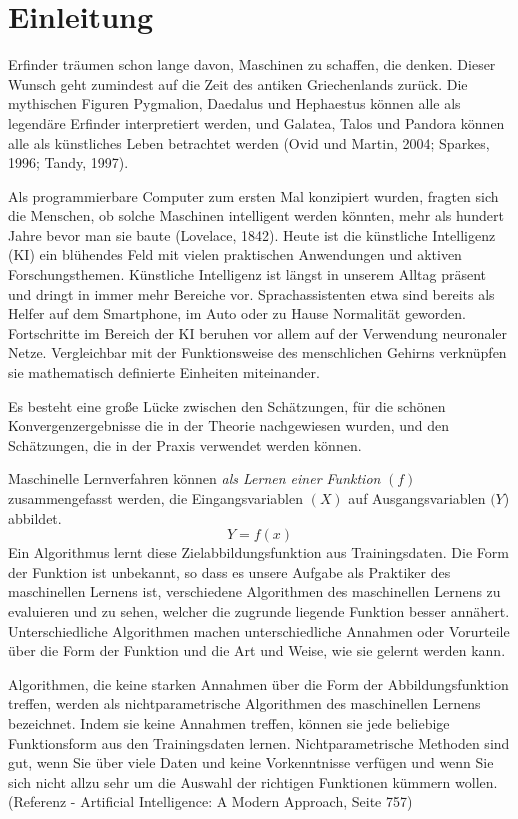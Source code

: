 \chapter*{Einleitung}

Erfinder träumen schon lange davon, Maschinen zu schaffen, die denken. Dieser Wunsch geht zumindest auf die Zeit des antiken Griechenlands zurück. Die mythischen Figuren Pygmalion, Daedalus und Hephaestus können alle als legendäre Erfinder interpretiert werden, und Galatea, Talos und Pandora können alle als künstliches Leben betrachtet werden (Ovid und Martin, 2004; Sparkes, 1996; Tandy, 1997).

Als programmierbare Computer zum ersten Mal konzipiert wurden, fragten sich die Menschen, ob solche Maschinen intelligent werden könnten, mehr als hundert Jahre bevor man sie baute (Lovelace, 1842). Heute ist die künstliche Intelligenz (KI) ein blühendes Feld mit vielen praktischen Anwendungen und aktiven Forschungsthemen. 
Künstliche Intelligenz ist längst in unserem Alltag präsent und dringt in immer mehr Bereiche vor. Sprachassistenten etwa sind bereits als Helfer auf dem Smartphone, im Auto oder zu Hause Normalität geworden. Fortschritte im Bereich der KI beruhen vor allem auf der Verwendung neuronaler Netze. Vergleichbar mit der Funktionsweise des menschlichen Gehirns verknüpfen sie mathematisch definierte Einheiten miteinander.

Es besteht eine große Lücke zwischen den Schätzungen, für die schönen Konvergenzergebnisse die in der Theorie nachgewiesen wurden, und den Schätzungen, die in der Praxis verwendet werden können.

Maschinelle Lernverfahren können \emph{als Lernen einer Funktion} $(f)$ zusammengefasst werden, die Eingangsvariablen $(X)$ auf Ausgangsvariablen $(Y$) abbildet.
$$Y = f(x)$$
Ein Algorithmus lernt diese Zielabbildungsfunktion aus Trainingsdaten.
Die Form der Funktion ist unbekannt, so dass es unsere Aufgabe als Praktiker des maschinellen Lernens ist, verschiedene Algorithmen des maschinellen Lernens zu evaluieren und zu sehen, welcher die zugrunde liegende Funktion besser annähert.
Unterschiedliche Algorithmen machen unterschiedliche Annahmen oder Vorurteile über die Form der Funktion und die Art und Weise, wie sie gelernt werden kann.

Algorithmen, die keine starken Annahmen über die Form der Abbildungsfunktion treffen, werden als nichtparametrische Algorithmen des maschinellen Lernens bezeichnet. Indem sie keine Annahmen treffen, können sie jede beliebige Funktionsform aus den Trainingsdaten lernen.
Nichtparametrische Methoden sind gut, wenn Sie über viele Daten und keine Vorkenntnisse verfügen und wenn Sie sich nicht allzu sehr um die Auswahl der richtigen Funktionen kümmern wollen. (Referenz - Artificial Intelligence: A Modern Approach, Seite 757)

